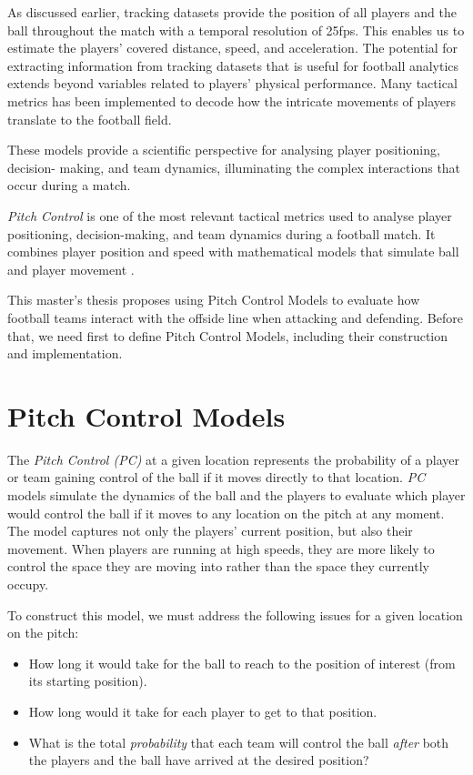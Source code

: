 \documentclass[
  10pt,
  twoside,nohyper]{book}
\providecommand{\tightlist}{%
  \setlength{\itemsep}{0pt}\setlength{\parskip}{0pt}}
\begin{document}
As discussed earlier, tracking datasets provide the position of all players and the ball throughout the match with a temporal resolution of 25fps. This enables us to estimate the players' covered distance, speed, and acceleration. The potential for extracting information from tracking datasets that is useful for football analytics extends beyond variables related to players' physical performance. Many tactical metrics has been implemented to decode how the intricate movements of players translate to the football field.

These models provide a scientific perspective for analysing player positioning, decision-
making, and team dynamics, illuminating the complex interactions that occur during a
match.

\emph{Pitch Control} is one of the most relevant tactical metrics used to analyse player positioning, decision-making, and team dynamics during a football match. It combines player position and speed with mathematical models that simulate ball and player movement \autocite{Spearman}.

This master's thesis proposes using Pitch Control Models to evaluate how football teams interact with the offside line when attacking and defending. Before that, we need first to define Pitch Control Models, including their construction and implementation.

\section{Pitch Control Models}\label{pitch-control-models}

The \emph{Pitch Control (PC)} at a given location represents the probability of a player or team gaining control of the ball if it moves directly to that location. \emph{PC} models simulate the dynamics of the ball and the players to evaluate which player would control the ball if it moves to any location on the pitch at any moment.
The model captures not only the players' current position, but also their movement. When players are running at high speeds, they are more likely to control
the space they are moving into rather than the space they currently occupy.

To construct this model, we must address the following issues for a given location on the pitch:

\begin{itemize}
\tightlist
\item
  How long it would take for the ball to reach to the position of interest (from its starting position).
\item
  How long would it take for each player to get to that position.
\item
  What is the total \emph{probability} that each team will control the ball \emph{after} both the players and the ball have arrived at the desired position?
\end{itemize}
\end{document}
